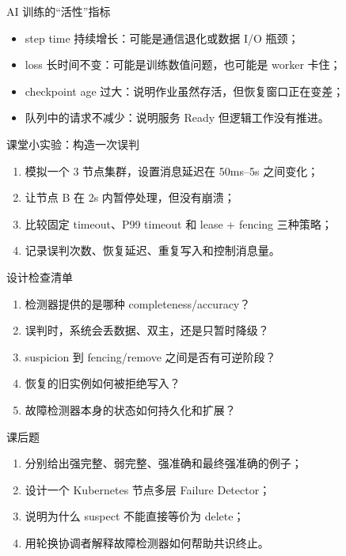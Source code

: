 \documentclass[UTF8,fontset=none,aspectratio=169,10pt]{beamer}
\begin{document}
\begin{frame}{AI 训练的“活性”指标}
\begin{itemize}
  \item step time 持续增长：可能是通信退化或数据 I/O 瓶颈；
  \item loss 长时间不变：可能是训练数值问题，也可能是 worker 卡住；
  \item checkpoint age 过大：说明作业虽然存活，但恢复窗口正在变差；
  \item 队列中的请求不减少：说明服务 Ready 但逻辑工作没有推进。
\end{itemize}
\end{frame}

\begin{frame}{课堂小实验：构造一次误判}
\begin{enumerate}
  \item 模拟一个 3 节点集群，设置消息延迟在 50ms--5s 之间变化；
  \item 让节点 B 在 2s 内暂停处理，但没有崩溃；
  \item 比较固定 timeout、P99 timeout 和 lease + fencing 三种策略；
  \item 记录误判次数、恢复延迟、重复写入和控制消息量。
\end{enumerate}
\end{frame}

\begin{frame}{设计检查清单}
\begin{enumerate}
  \item 检测器提供的是哪种 completeness/accuracy？
  \item 误判时，系统会丢数据、双主，还是只暂时降级？
  \item suspicion 到 fencing/remove 之间是否有可逆阶段？
  \item 恢复的旧实例如何被拒绝写入？
  \item 故障检测器本身的状态如何持久化和扩展？
\end{enumerate}
\end{frame}

\begin{frame}{课后题}
\begin{enumerate}
  \item 分别给出强完整、弱完整、强准确和最终强准确的例子；
  \item 设计一个 Kubernetes 节点多层 Failure Detector；
  \item 说明为什么 suspect 不能直接等价为 delete；
  \item 用轮换协调者解释故障检测器如何帮助共识终止。
\end{enumerate}
\end{frame}
\end{document}
